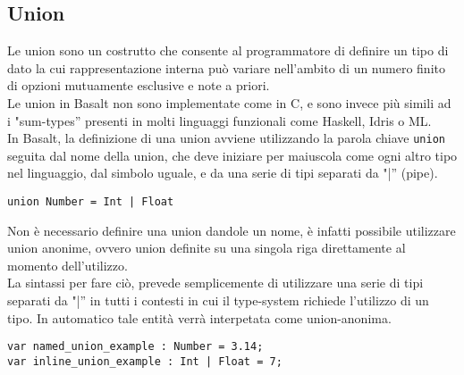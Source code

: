 \subsection{Union}
Le union sono un costrutto che consente al programmatore di definire un tipo di dato la cui rappresentazione 
interna può variare nell’ambito di un numero finito di opzioni mutuamente esclusive e note a priori. \\ 

Le union in Basalt non sono implementate come in C, e sono invece più simili ad i "sum-types” presenti in molti 
linguaggi funzionali come Haskell, Idris o ML. \\

In Basalt, la definizione di una union avviene utilizzando la parola chiave \texttt{union} seguita dal nome della union, 
che deve iniziare per maiuscola come ogni altro tipo nel linguaggio, dal simbolo uguale, 
e da una serie di tipi separati da "|” (pipe). \\

\vspace{0.5cm}
\begin{lstlisting}[frame=single]
union Number = Int | Float
\end{lstlisting}
\vspace{0.5cm}

Non è necessario definire una union dandole un nome, è infatti possibile utilizzare union anonime, 
ovvero union definite su una singola riga direttamente al momento dell’utilizzo. \\

La sintassi per fare ciò, prevede semplicemente di utilizzare  una serie di tipi separati da "|”
in tutti i contesti in cui il type-system richiede l’utilizzo di un tipo. In automatico 
tale entità verrà interpetata come union-anonima. \\

\vspace{0.5cm}
\begin{lstlisting}[frame=single]
var named_union_example : Number = 3.14;     
var inline_union_example : Int | Float = 7;
\end{lstlisting}
\vspace{0.5cm}


\newpage
 

\newpage

 

\newpage
 

\newpage